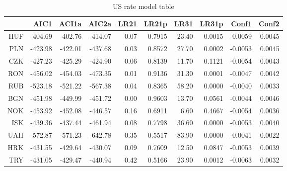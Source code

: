 \documentclass[12pt, a4paper, oneside]{article} %
\begin{document}
\begin{landscape}
\begin{table}[ht]
\centering
\begin{tabular}{rrrrrrrrrr}
  \hline
 & AIC1 & ACI1a & AIC2a & LR21 & LR21p & LR31 & LR31p & Conf1 & Conf2 \\ 
  \hline
HUF & -404.69 & -402.76 & -414.07 & 0.07 & 0.7915 & 23.40 & 0.0015 & -0.0059 & 0.0045 \\ 
  PLN & -423.98 & -422.01 & -437.68 & 0.03 & 0.8572 & 27.70 & 0.0002 & -0.0053 & 0.0045 \\ 
  CZK & -427.23 & -425.29 & -424.90 & 0.06 & 0.8139 & 11.70 & 0.1121 & -0.0054 & 0.0043 \\ 
  RON & -456.02 & -454.03 & -473.35 & 0.01 & 0.9136 & 31.30 & 0.0001 & -0.0047 & 0.0042 \\ 
  RUB & -523.18 & -521.22 & -567.38 & 0.04 & 0.8365 & 58.20 & 0.0000 & -0.0040 & 0.0033 \\ 
  BGN & -451.98 & -449.99 & -451.72 & 0.00 & 0.9603 & 13.70 & 0.0561 & -0.0044 & 0.0046 \\ 
  NOK & -453.92 & -452.08 & -446.57 & 0.16 & 0.6911 & 6.60 & 0.4667 & -0.0054 & 0.0036 \\ 
  ISK & -439.36 & -437.44 & -461.94 & 0.08 & 0.7798 & 36.60 & 0.0000 & -0.0053 & 0.0040 \\ 
  UAH & -572.87 & -571.23 & -642.78 & 0.35 & 0.5517 & 83.90 & 0.0000 & -0.0041 & 0.0022 \\ 
  HRK & -431.55 & -429.64 & -430.07 & 0.09 & 0.7609 & 12.50 & 0.0847 & -0.0053 & 0.0039 \\ 
  TRY & -431.05 & -429.47 & -440.94 & 0.42 & 0.5166 & 23.90 & 0.0012 & -0.0063 & 0.0032 \\ 
   \hline
\end{tabular}
\caption{US rate model table} 
\label{tabref:comptab}
\end{table}
\end{landscape}
\end{document}
